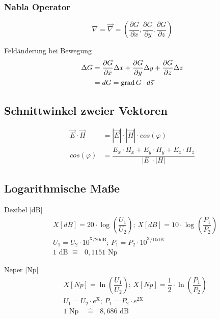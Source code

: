 \subsubsection*{Nabla Operator}
\[
    \nabla = \vec{\nabla} = \left( \dfrac{\partial G}{\partial x},
    \dfrac{\partial G}{\partial y}, \dfrac{\partial G}{\partial z} \right)
\]

Feldänderung bei Bewegung
\begin{align*}
    \Delta G & = \dfrac{\partial G}{\partial x} \Delta x + \dfrac{\partial G}{\partial y} \Delta y + \dfrac{\partial G}{\partial z} \Delta z \\
             & = dG = \operatorname{grad} G \cdot d \vec{s}
\end{align*}

\subsection{Schnittwinkel zweier Vektoren}
\begin{align*}
    \vec{E} \cdot \vec{H} & = |\vec{E}| \cdot |\vec{H}| \cdot cos(\varphi)                         \\
    cos(\varphi)          & = \dfrac{E_x \cdot H_x + E_y \cdot H_y + E_z \cdot H_z}{|E| \cdot |H|}
\end{align*}

\subsection{Logarithmische Maße}
\begin{description}
    \item Dezibel [dB]
          \begin{align*}
            & X[dB] = 20 \cdot \log_{} \left( \dfrac{U_1}{U_2}\right) \text{; }
            X[dB] = 10 \cdot \log_{} \left( \dfrac{P_1}{P_2}\right)\\
            & U_1 = U_2 \cdot 10^{^\text{X}/\text{20dB}}\text{; }
              P_1 = P_2 \cdot  10^{^\text{X}/\text{10dB}}\\
            & 1 \text{ dB } \hat{=} \text{ } 0,1151 \text{ Np}
          \end{align*}

    \item Neper [Np]
          \begin{align*}
            & X[Np] = \ln \left(\dfrac{U_1}{U_2}\right) \text{; }                                                                            
              X[Np] = \dfrac{1}{2} \cdot \ln \left(\dfrac{P_1}{P_2}\right)\\
              & U_1 = U_2 \cdot e^{\text{X}}\text{; }
              P_1 = P_2 \cdot  e^{\text{2X}}\\
            &1 \text{ Np } \text{ } \hat{=} \text{ } 8,686 \text{ dB} %
          \end{align*}
\end{description}

